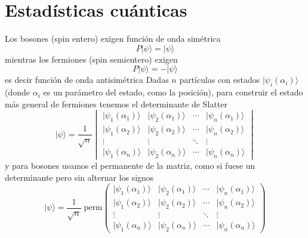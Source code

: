 \documentclass{book}
\numberwithin{equation}{section} %
\begin{document}
\section{Estadísticas cuánticas}
  Los bosones (spin entero) exigen función de onda simétrica 
\begin{equation}
  P |\psi\rangle = |\psi\rangle
\end{equation}
mientras los fermiones (spin semientero) exigen
\begin{equation}
 P |\psi\rangle = - |\psi\rangle
\end{equation}
es decir función de onda antisimétrica
Dadas $n$ partículas con estados $|\psi_i(\alpha_i)\rangle$ (donde $\alpha_i$ es un parámetro del estado, como la posición), para construir el estado más general de fermiones tenemos el determinante de Slatter
\begin{equation}
  |\psi\rangle = \frac{1}{\sqrt{n}} \begin{vmatrix} |\psi_1(\alpha_1)\rangle & |\psi_2(\alpha_1)\rangle & \cdots & |\psi_n(\alpha_1)\rangle \\  |\psi_1(\alpha_2)\rangle & |\psi_2(\alpha_2)\rangle & \cdots & |\psi_n(\alpha_2)\rangle \\ \vdots & \vdots & \ddots & \vdots \\  |\psi_1(\alpha_n)\rangle & |\psi_2(\alpha_n)\rangle & \cdots & |\psi_n(\alpha_n)\rangle \end{vmatrix}
\end{equation}
y para bosones usamos el permanente de la matriz, como si fuese un determinante pero sin alternar los signos
\begin{equation}
   |\psi\rangle = \frac{1}{\sqrt{n}}\; \text{perm}\begin{pmatrix} |\psi_1(\alpha_1)\rangle & |\psi_2(\alpha_1)\rangle & \cdots & |\psi_n(\alpha_1)\rangle \\  |\psi_1(\alpha_2)\rangle & |\psi_2(\alpha_2)\rangle & \cdots & |\psi_n(\alpha_2)\rangle \\ \vdots & \vdots & \ddots & \vdots \\  |\psi_1(\alpha_n)\rangle & |\psi_2(\alpha_n)\rangle & \cdots & |\psi_n(\alpha_n)\rangle \end{pmatrix}
\end{equation}
\end{document}
